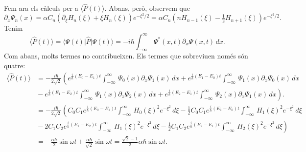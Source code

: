\documentclass[12pt]{article}
\numberwithin{table}{section}
\numberwithin{figure}{section}
\numberwithin{equation}{section}
\newcommand{\ket}[1]{\vert #1 \rangle}
\newcommand{\bra}[1]{\langle #1 \vert}
\begin{document}
\begin{enumerate}[label=(\alph*), font=\bfseries \sffamily, wide, labelwidth=!, labelindent=0pt]
Fem ara els càlculs per a \( \langle \hat{P}(t) \rangle \). Abans, però, observem que
\begin{equation*}
	\partial_x \Psi_n(x) = \alpha C_n \left(\partial_\xi H_n(\xi) + \xi H_n(\xi)\right)e^{-\xi^2/2} = \alpha C_n \left(nH_{n-1}(\xi) - \tfrac{1}{2}H_{n+1}(\xi)\right) e^{-\xi^2/2}. 
\end{equation*}
Tenim
\begin{equation*}
	\langle \hat{P}(t) \rangle	= \bra{\Psi(t)} \hat{P} \ket{\Psi(t)} = -i\hbar \int_{-\infty}^\infty \, \Psi^{\ast}(x,t) \partial_x\Psi(x,t) \, dx.
\end{equation*}
Com abans, molts termes no contribueixen. Els termes que sobreviuen només són quatre:
\begin{align*}
	\langle \hat{P}(t) \rangle & = -\frac{i\hbar}{2\sqrt{2}}\left(e^{\frac{i}{\hbar}(E_0 - E_1)t} \int_{-\infty}^\infty\,\Psi_0(x)\partial_x \Psi_1(x) \,dx + e^{\frac{i}{\hbar}(E_1 - E_0)t} \int_{-\infty}^\infty\,\Psi_1(x)\partial_x \Psi_0(x) \,dx \right. \\
														 & \left. {} - e^{\frac{i}{\hbar}(E_1 - E_2)t} \int_{-\infty}^\infty\,\Psi_1(x)\partial_x \Psi_2(x) \,dx + e^{\frac{i}{\hbar}(E_2 - E_1)t} \int_{-\infty}^\infty\,\Psi_2(x)\partial_x \Psi_1(x) \,dx \right). \\
														 & = -\frac{i\hbar}{2\sqrt{2}}\left(C_0 C_1 e^{\frac{i}{\hbar}(E_0 - E_1)t} \int_{-\infty}^\infty\,H_0(\xi)^2 e^{-\xi^2} \,d\xi - \tfrac{1}{2} C_0C_1 e^{\frac{i}{\hbar}(E_1 - E_0)t} \int_{-\infty}^\infty\, H_1(\xi)^2 e^{-\xi^2} \, d\xi \right. \\
														 & \left. {} -  2C_1 C_2 e^{\frac{i}{\hbar}(E_1 - E_2)t} \int_{-\infty}^\infty \, H_1(\xi)^2 e^{-\xi^2} \,d\xi - \tfrac{1}{2} C_1C_2 e^{\frac{i}{\hbar}(E_2 - E_1)t} \int_{-\infty}^\infty\, H_2(\xi)^2  e^{-\xi^2} \, d\xi \right) \\
														 & = -\frac{\alpha \hbar}{2}\sin{\omega t} + \frac{\alpha \hbar}{\sqrt{2}} \sin{\omega t} = \frac{\sqrt{2} - 1}{2} \alpha \hbar \sin{\omega t}. 
\end{align*}


\end{enumerate}
\end{document}
